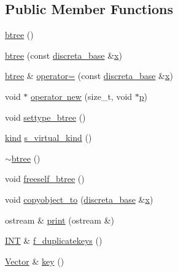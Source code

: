 \subsection*{Public Member Functions}
\begin{DoxyCompactItemize}
\item 
\mbox{\hyperlink{classbtree_a91719c0888688e6f11dbeb336f2bd11b}{btree}} ()
\item 
\mbox{\hyperlink{classbtree_acdd426e62444f342e4fa3ac6a272fb32}{btree}} (const \mbox{\hyperlink{classdiscreta__base}{discreta\+\_\+base}} \&\mbox{\hyperlink{alphabet2_8_c_a6150e0515f7202e2fb518f7206ed97dc}{x}})
\item 
\mbox{\hyperlink{classbtree}{btree}} \& \mbox{\hyperlink{classbtree_a2c95dcf64612ac0dd88b47f004dd84d9}{operator=}} (const \mbox{\hyperlink{classdiscreta__base}{discreta\+\_\+base}} \&\mbox{\hyperlink{alphabet2_8_c_a6150e0515f7202e2fb518f7206ed97dc}{x}})
\item 
void $\ast$ \mbox{\hyperlink{classbtree_a266447f479a8304c819768bbf0e7dd3d}{operator new}} (size\+\_\+t, void $\ast$\mbox{\hyperlink{alphabet2_8_c_a533391314665d6bf1b5575e9a9cd8552}{p}})
\item 
void \mbox{\hyperlink{classbtree_a5a1b9773c848908a6050cc733d2d9780}{settype\+\_\+btree}} ()
\item 
\mbox{\hyperlink{discreta_8h_aaf25ee7e2306d78c74ec7bc48f092e81}{kind}} \mbox{\hyperlink{classbtree_afffc3582b6eda450238f4cb268e79ef3}{s\+\_\+virtual\+\_\+kind}} ()
\item 
\mbox{\hyperlink{classbtree_ab3d5728b7a09121f7461fddd08b5f7ef}{$\sim$btree}} ()
\item 
void \mbox{\hyperlink{classbtree_af866a69c5f887781efdcd491d71f2c28}{freeself\+\_\+btree}} ()
\item 
void \mbox{\hyperlink{classbtree_ae990f68198985c1c7c7a36a65f091ac7}{copyobject\+\_\+to}} (\mbox{\hyperlink{classdiscreta__base}{discreta\+\_\+base}} \&\mbox{\hyperlink{alphabet2_8_c_a6150e0515f7202e2fb518f7206ed97dc}{x}})
\item 
ostream \& \mbox{\hyperlink{classbtree_a76cbc154a13a6464d16a7f080cef40d3}{print}} (ostream \&)
\item 
\mbox{\hyperlink{galois_8h_a09fddde158a3a20bd2dcadb609de11dc}{I\+NT}} \& \mbox{\hyperlink{classbtree_aa53430cc1a527debec6fe02f1c8a2bf5}{f\+\_\+duplicatekeys}} ()
\item 
\mbox{\hyperlink{class_vector}{Vector}} \& \mbox{\hyperlink{classbtree_abc561b2c60acc5a699637b7eb2549503}{key}} ()
\item 

\end{DoxyCompactItemize}
